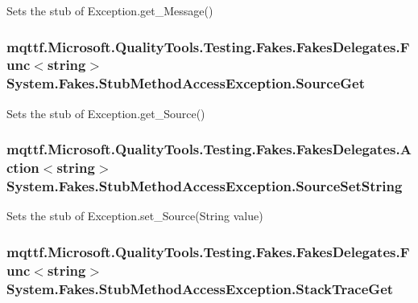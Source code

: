 Sets the stub of Exception.\-get\-\_\-\-Message()

\hypertarget{class_system_1_1_fakes_1_1_stub_method_access_exception_a7ecc5759e60c54752f5bb6e7d540aee3}{
\subsubsection[{Source\-Get}]{\setlength{\rightskip}{0pt plus 5cm}mqttf.\-Microsoft.\-Quality\-Tools.\-Testing.\-Fakes.\-Fakes\-Delegates.\-Func$<$string$>$ System.\-Fakes.\-Stub\-Method\-Access\-Exception.\-Source\-Get}}\label{class_system_1_1_fakes_1_1_stub_method_access_exception_a7ecc5759e60c54752f5bb6e7d540aee3}


Sets the stub of Exception.\-get\-\_\-\-Source()

\hypertarget{class_system_1_1_fakes_1_1_stub_method_access_exception_a438a974d11b2318ac63efd4761c8188f}{
\subsubsection[{Source\-Set\-String}]{\setlength{\rightskip}{0pt plus 5cm}mqttf.\-Microsoft.\-Quality\-Tools.\-Testing.\-Fakes.\-Fakes\-Delegates.\-Action$<$string$>$ System.\-Fakes.\-Stub\-Method\-Access\-Exception.\-Source\-Set\-String}}\label{class_system_1_1_fakes_1_1_stub_method_access_exception_a438a974d11b2318ac63efd4761c8188f}


Sets the stub of Exception.\-set\-\_\-\-Source(\-String value)

\hypertarget{class_system_1_1_fakes_1_1_stub_method_access_exception_ad8b00bdbd2a08659544c901193244230}{
\subsubsection[{Stack\-Trace\-Get}]{\setlength{\rightskip}{0pt plus 5cm}mqttf.\-Microsoft.\-Quality\-Tools.\-Testing.\-Fakes.\-Fakes\-Delegates.\-Func$<$string$>$ System.\-Fakes.\-Stub\-Method\-Access\-Exception.\-Stack\-Trace\-Get}}\label{class_system_1_1_fakes_1_1_stub_method_access_exception_ad8b00bdbd2a08659544c901193244230}


